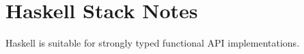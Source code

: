 \section{Haskell Stack Notes}

Haskell is suitable for strongly typed functional API implementations.

